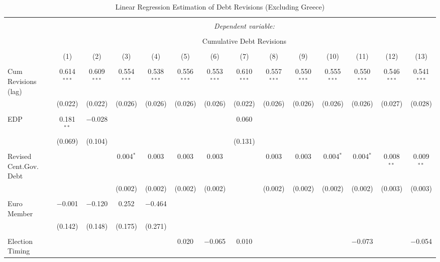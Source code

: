 
\begin{table}[!htbp] \centering 
  \caption{Linear Regression Estimation of Debt Revisions (Excluding Greece)} 
  \label{results_no_greece} 
\tiny 
\begin{tabular}{@{\extracolsep{5pt}}lccccccccccccc} 
\\[-1.8ex]\hline 
\hline \\[-1.8ex] 
 & \multicolumn{13}{c}{\textit{Dependent variable:}} \\ 
\cline{2-14} 
\\[-1.8ex] & \multicolumn{13}{c}{Cumulative Debt Revisions} \\ 
\\[-1.8ex] & (1) & (2) & (3) & (4) & (5) & (6) & (7) & (8) & (9) & (10) & (11) & (12) & (13)\\ 
\hline \\[-1.8ex] 
 Cum Revisions (lag) & 0.614$^{***}$ & 0.609$^{***}$ & 0.554$^{***}$ & 0.538$^{***}$ & 0.556$^{***}$ & 0.553$^{***}$ & 0.610$^{***}$ & 0.557$^{***}$ & 0.550$^{***}$ & 0.555$^{***}$ & 0.550$^{***}$ & 0.546$^{***}$ & 0.541$^{***}$ \\ 
  & (0.022) & (0.022) & (0.026) & (0.026) & (0.026) & (0.026) & (0.022) & (0.026) & (0.026) & (0.026) & (0.026) & (0.027) & (0.028) \\ 
  & & & & & & & & & & & & & \\ 
 EDP & 0.181$^{**}$ & $-$0.028 &  &  &  &  & 0.060 &  &  &  &  &  &  \\ 
  & (0.069) & (0.104) &  &  &  &  & (0.131) &  &  &  &  &  &  \\ 
  & & & & & & & & & & & & & \\ 
 Revised Cent.Gov. Debt &  &  & 0.004$^{*}$ & 0.003 & 0.003 & 0.003 &  & 0.003 & 0.003 & 0.004$^{*}$ & 0.004$^{*}$ & 0.008$^{**}$ & 0.009$^{**}$ \\ 
  &  &  & (0.002) & (0.002) & (0.002) & (0.002) &  & (0.002) & (0.002) & (0.002) & (0.002) & (0.003) & (0.003) \\ 
  & & & & & & & & & & & & & \\ 
 Euro Member & $-$0.001 & $-$0.120 & 0.252 & $-$0.464 &  &  &  &  &  &  &  &  &  \\ 
  & (0.142) & (0.148) & (0.175) & (0.271) &  &  &  &  &  &  &  &  &  \\ 
  & & & & & & & & & & & & & \\ 
 Election Timing &  &  &  &  & 0.020 & $-$0.065 & 0.010 &  &  &  & $-$0.073 &  & $-$0.054 \\ 

\end{tabular}
\end{table}
